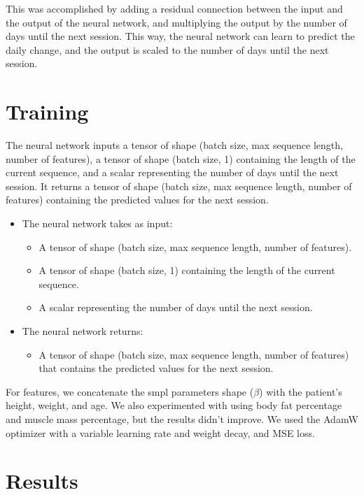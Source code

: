 This was accomplished by adding a residual connection between the input and the
output of the neural network, and multiplying the output by the number of days
until the next session. This way, the neural network can learn to predict the
daily change, and the output is scaled to the number of days until the next
session.

\section{Training}

The neural network inputs a tensor of shape (batch size, max sequence length,
number of features), a tensor of shape (batch size, 1) containing the length of
the current sequence, and a scalar representing the number of days until the
next session. It returns a tensor of shape (batch size, max sequence length,
number of features) containing the predicted values for the next session.

\begin{itemize}
    \item The neural network takes as input:
          \begin{itemize}
              \item A tensor of shape (batch size, max sequence length, number of features).
              \item A tensor of shape (batch size, 1) containing the length of the current
                    sequence.
              \item A scalar representing the number of days until the next session.
          \end{itemize}
    \item The neural network returns:
          \begin{itemize}
              \item A tensor of shape (batch size, max sequence length, number of features) that
                    contains the predicted values for the next session.
          \end{itemize}
\end{itemize}

For features, we concatenate the \gls{smpl} parameters shape ($\beta$) with the
patient's height, weight, and age. We also experimented with using body fat
percentage and muscle mass percentage, but the results didn't improve. We used
the AdamW optimizer with a variable learning rate and weight decay, and MSE
loss.

\section{Results}

